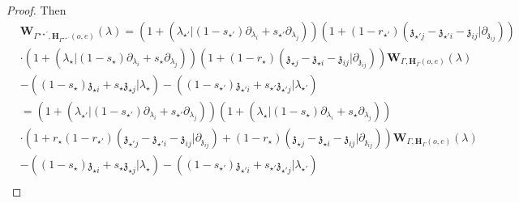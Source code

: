 \documentclass[11pt]{amsart}
\theoremstyle{definition}
\theoremstyle{remark}
\numberwithin{equation}{section}
\begin{document}
\begin{proof}
  Then
  \begin{align*}
& \mathbf{W}_{\Gamma^{\star\star'},\mathbf{H}_{\Gamma^{\star\star'}}(o,e)}(\lambda)  =\left(1+(\lambda_{\star'}|(1-s_{\star'})\partial_{\lambda_i}+s_{\star'}\partial_{\lambda_j})\right)\left(1+(1-r_{\star'})(\mathfrak{z}_{\star' j}-\mathfrak{z}_{\star' i}-\mathfrak{z}_{ij}|\partial_{\mathfrak{z}_{ij}})\right)\\
&\cdot \left(1+(\lambda_{\star}|(1-s_{\star})\partial_{\lambda_i}+s_{\star}\partial_{\lambda_j})\right)\left(1+(1-r_{\star})(\mathfrak{z}_{\star j}-\mathfrak{z}_{\star i}-\mathfrak{z}_{ij}|\partial_{\mathfrak{z}_{ij}})\right)\mathbf{W}_{\Gamma,\mathbf{H}_{\Gamma}(o,e)}(\lambda)\\
&-\left((1-s_{\star})\mathfrak{z}_{\star i}+s_{\star}\mathfrak{z}_{\star j}|\lambda_{\star}\right)-\left((1-s_{\star'})\mathfrak{z}_{\star' i}+s_{\star'}\mathfrak{z}_{\star' j}|\lambda_{\star'}\right) \\
&=\left(1+(\lambda_{\star'}|(1-s_{\star'})\partial_{\lambda_i}+s_{\star'}\partial_{\lambda_j})\right)\left(1+(\lambda_{\star}|(1-s_{\star})\partial_{\lambda_i}+s_{\star}\partial_{\lambda_j})\right)\\
&\cdot \left(1+r_{\star}(1-r_{\star'})(\mathfrak{z}_{\star' j}-\mathfrak{z}_{\star' i}-\mathfrak{z}_{ij}|\partial_{\mathfrak{z}_{ij}})+(1-r_{\star})(\mathfrak{z}_{\star j}-\mathfrak{z}_{\star i}-\mathfrak{z}_{ij}|\partial_{\mathfrak{z}_{ij}})\right)\mathbf{W}_{\Gamma,\mathbf{H}_{\Gamma}(o,e)}(\lambda)\\
&-\left((1-s_{\star})\mathfrak{z}_{\star i}+s_{\star}\mathfrak{z}_{\star j}|\lambda_{\star}\right)-\left((1-s_{\star'})\mathfrak{z}_{\star' i}+s_{\star'}\mathfrak{z}_{\star' j}|\lambda_{\star'}\right) \\
\end{align*}


\end{proof}
\end{document}
